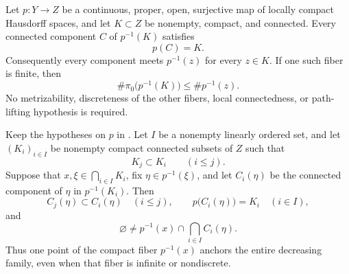 
\begin{theorem}
\label{thm:p031-proper-open-component-surjectivity}
Let $p:Y\to Z$ be a continuous, proper, open, surjective map of locally
compact Hausdorff spaces, and let $K\subset Z$ be nonempty, compact, and
connected.  Every connected component $C$ of $p^{-1}(K)$ satisfies
\begin{equation}
\label{eq:p031-proper-open-component-surjectivity}
                         p(C)=K.
\end{equation}
Consequently every component meets $p^{-1}(z)$ for every $z\in K$.  If one
such fiber is finite, then
\begin{equation}
\label{eq:p031-proper-open-component-cardinality}
        \#\pi_0\bigl(p^{-1}(K)\bigr)\leq\#p^{-1}(z).
\end{equation}
No metrizability, discreteness of the other fibers, local connectedness, or
path-lifting hypothesis is required.
\end{theorem}

\begin{theorem}
\label{thm:p031-proper-open-persistent-component-anchor}
Keep the hypotheses on $p$ in
.  Let $I$ be a nonempty
linearly ordered set, and let $(K_i)_{i\in I}$ be nonempty compact connected
subsets of $Z$ such that
\[
                   K_j\subset K_i\qquad(i\leq j).
\]
Suppose that $x,\xi\in\bigcap_{i\in I}K_i$, fix
$\eta\in p^{-1}(\xi)$, and let $C_i(\eta)$ be the connected component of
$\eta$ in $p^{-1}(K_i)$.  Then
\begin{equation}
\label{eq:p031-proper-open-persistent-component-nesting}
 C_j(\eta)\subset C_i(\eta)\quad(i\leq j),
 \qquad
 p\bigl(C_i(\eta)\bigr)=K_i\quad(i\in I),
\end{equation}
and
\begin{equation}
\label{eq:p031-proper-open-persistent-component-anchor}
 \varnothing\ne
 p^{-1}(x)\cap\bigcap_{i\in I}C_i(\eta).
\end{equation}
Thus one point of the compact fiber $p^{-1}(x)$ anchors the entire decreasing
family, even when that fiber is infinite or nondiscrete.
\end{theorem}

